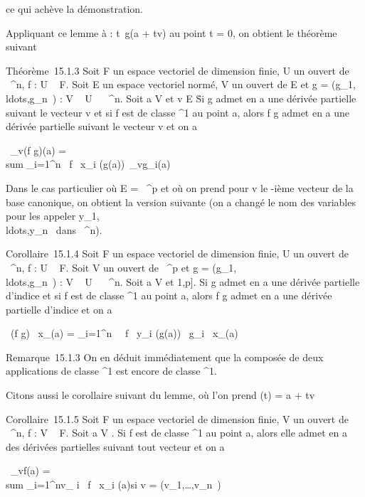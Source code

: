\documentclass[]{article}
\begin{document}
ce qui achève la démonstration.

Appliquant ce lemme à \phi : t\mapsto~g(a + tv) au
point t = 0, on obtient le théorème suivant

Théorème~15.1.3 Soit F un espace vectoriel de dimension finie, U un
ouvert de ~^n, f : U \rightarrow~ F. Soit E un espace vectoriel normé, V
un ouvert de E et g =
(g\_1,\\ldots,g\_n~)
: V \rightarrow~ U \subset~ ~^n. Soit a \in V et v \in E
\diagdown\0\. Si g admet en a une dérivée
partielle suivant le vecteur v et si f est de classe ^1 au
point a, alors f \cdot g admet en a une dérivée partielle suivant le vecteur
v et on a

\partial~\_v(f \cdot g)(a) = \\sum
\_i=1^n \partial~f \over \partial~x\_i
(g(a))\partial~\_vg\_i(a)

Dans le cas particulier où E = ~^p et où on prend pour v le
\jmath-ième vecteur de la base canonique, on obtient la version suivante (on
a changé le nom des variables pour les appeler
y\_1,\\ldots,y\_n~
dans ~^n).

Corollaire~15.1.4 Soit F un espace vectoriel de dimension finie, U un
ouvert de ~^n, f : U \rightarrow~ F. Soit V un ouvert de ~^p
et g =
(g\_1,\\ldots,g\_n~)
: V \rightarrow~ U \subset~ ~^n. Soit a \in V et \jmath \in {[}1,p{]}. Si g admet en a
une dérivée partielle d'indice \jmath et si f est de classe ^1 au
point a, alors f \cdot g admet en a une dérivée partielle d'indice \jmath et on a

 \partial~(f \cdot g) \over \partial~x\_\jmath (a) =
\sum \_i=1^n~ \partial~f
\over \partial~y\_i (g(a)) \partial~g\_i
\over \partial~x\_\jmath (a)

Remarque~15.1.3 On en déduit immédiatement que la composée de deux
applications de classe ^1 est encore de classe
^1.

Citons aussi le corollaire suivant du lemme, où l'on prend \phi(t) = a + tv

Corollaire~15.1.5 Soit F un espace vectoriel de dimension finie, V un
ouvert de ~^n, f : V \rightarrow~ F. Soit a \in V . Si f est de classe
^1 au point a, alors elle admet en a des dérivées partielles
suivant tout vecteur et on a

\partial~\_vf(a) = \\sum
\_i=1^nv\_ i \partial~f \over
\partial~x\_i (a)\qquad \text si v =
(v\_1,\ldots,v\_n~)
\end{document}
